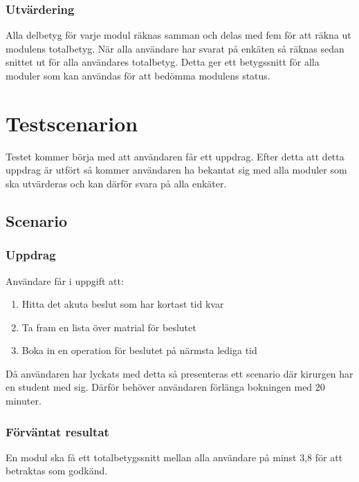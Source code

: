 \subsubsection{Utvärdering}
Alla delbetyg för varje modul räknas samman och delas med fem för att räkna ut modulens totalbetyg.
När alla användare har svarat på enkäten så räknas sedan snittet ut för alla användares totalbetyg. Detta ger ett betygssnitt för alla moduler som kan användas för att bedömma modulens status.
\section{Testscenarion}
Testet kommer börja med att användaren får ett uppdrag. Efter detta att detta uppdrag är utfört så kommer användaren ha bekantat sig med alla moduler som ska utvärderas och kan därför svara på alla enkäter. 
\subsection{Scenario}
\subsubsection{Uppdrag}
Användare får i uppgift att:
\begin{enumerate}
	\item Hitta det akuta beslut som har kortast tid kvar
	\item Ta fram en lista över matrial för beslutet
	\item Boka in en operation för beslutet på närmsta lediga tid
\end{enumerate}
Då användaren har lyckats med detta så presenteras ett scenario där kirurgen har en student med sig. Därför behöver användaren förlänga bokningen med 20 minuter.
\subsubsection{Förväntat resultat}
En modul ska få ett totalbetygssnitt mellan alla användare på minst 3,8 för att betraktas som godkänd.
